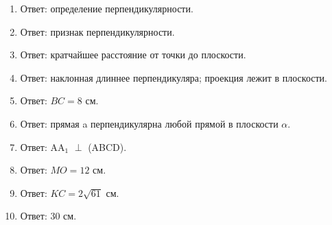 \documentclass{umk-matematika}
\begin{document}
\begin{enumerate}
  \item Ответ: определение перпендикулярности.
  \item Ответ: признак перпендикулярности.
  \item Ответ: кратчайшее расстояние от точки до плоскости.
  \item Ответ: наклонная длиннее перпендикуляра; проекция лежит в плоскости.
  \item Ответ: $BC = 8$ см.
  \item Ответ: прямая a перпендикулярна любой прямой в плоскости $\alpha$.
  \item Ответ: AA$_1$ $\perp$ (ABCD).
  \item Ответ: $MO = 12$ см.
  \item Ответ: $KC = 2\sqrt{61}$ см.
  \item Ответ: 30 см.
\end{enumerate}
\end{document}
